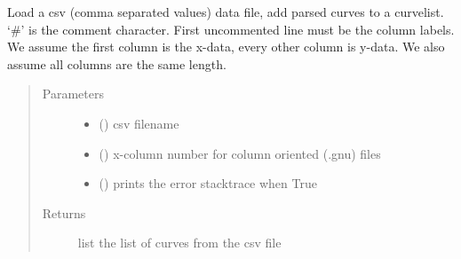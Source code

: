 \documentclass[letterpaper,10pt,english]{sphinxmanual}
\begin{document}
\begin{fulllineitems}
\label{\detokenize{pydv:pydvpy.readcsv}}
Load a csv (comma separated values) data file, add parsed curves to
a curvelist. ‘\#’ is the comment character.  First uncommented line must
be the column labels.  We assume the first column is the x-data, every
other column is y-data.  We also assume all columns are the same length.

\begin{sphinxVerbatim}[commandchars=\\\{\}]
  
\end{sphinxVerbatim}
\begin{quote}\begin{description}
\item[{Parameters}] \leavevmode\begin{itemize}
\item {} 
 () \textendash{} csv filename

\item {} 
 () \textendash{} x-column number for column oriented (.gnu) files

\item {} 
 () \textendash{} prints the error stacktrace when True

\end{itemize}

\item[{Returns}] \leavevmode
list \textendash{} the list of curves from the csv file

\end{description}\end{quote}

\end{fulllineitems}

\end{document}
